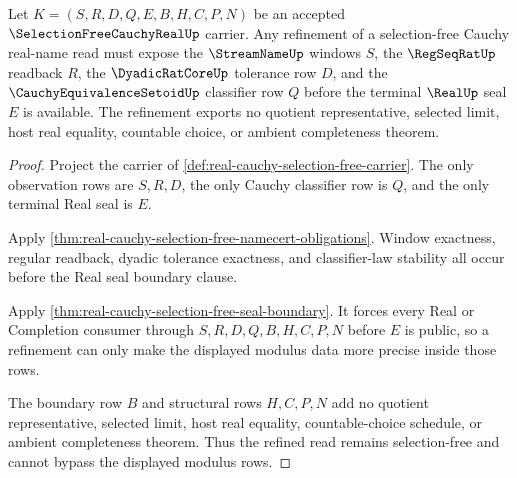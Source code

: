 \begin{theorem}
\label{thm:selection-free-cauchy-real-modulus-boundary}
Let $K=(S,R,D,Q,E,B,H,C,P,N)$ be an accepted $\SelectionFreeCauchyRealUp$ carrier. Any refinement of a selection-free Cauchy real-name read must expose the $\StreamNameUp$ windows $S$, the $\RegSeqRatUp$ readback $R$, the $\DyadicRatCoreUp$ tolerance row $D$, and the $\CauchyEquivalenceSetoidUp$ classifier row $Q$ before the terminal $\RealUp$ seal $E$ is available. The refinement exports no quotient representative, selected limit, host real equality, countable choice, or ambient completeness theorem.
\end{theorem}
\begin{proof}
Project the carrier of \autoref{def:real-cauchy-selection-free-carrier}. The only observation rows are $S,R,D$, the only Cauchy classifier row is $Q$, and the only terminal Real seal is $E$.

Apply \autoref{thm:real-cauchy-selection-free-namecert-obligations}. Window exactness, regular readback, dyadic tolerance exactness, and classifier-law stability all occur before the Real seal boundary clause.

Apply \autoref{thm:real-cauchy-selection-free-seal-boundary}. It forces every Real or Completion consumer through $S,R,D,Q,B,H,C,P,N$ before $E$ is public, so a refinement can only make the displayed modulus data more precise inside those rows.

The boundary row $B$ and structural rows $H,C,P,N$ add no quotient representative, selected limit, host real equality, countable-choice schedule, or ambient completeness theorem. Thus the refined read remains selection-free and cannot bypass the displayed modulus rows.
\end{proof}


\begin{closurestatus}{\SelectionFreeCauchyRealUp}
  \theoryclosure{\seedClosure}
  \formalstatus{\unformalizedV}
\end{closurestatus}
